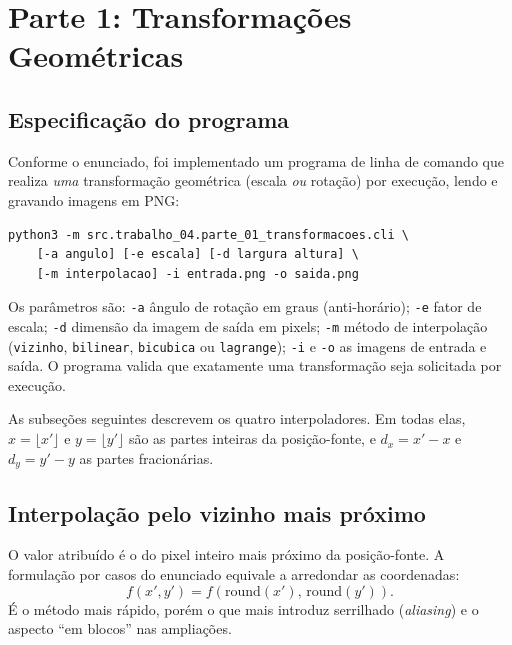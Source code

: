 \documentclass[12pt,a4paper]{article}
\begin{document}
\section{Parte 1: Transformações Geométricas}
\label{sec:parte1}

\subsection{Especificação do programa}

Conforme o enunciado, foi implementado um programa de linha de comando que
realiza \emph{uma} transformação geométrica (escala \emph{ou} rotação) por
execução, lendo e gravando imagens em PNG:

\begin{lstlisting}
python3 -m src.trabalho_04.parte_01_transformacoes.cli \
    [-a angulo] [-e escala] [-d largura altura] \
    [-m interpolacao] -i entrada.png -o saida.png
\end{lstlisting}

Os parâmetros são: \texttt{-a} ângulo de rotação em graus (anti-horário);
\texttt{-e} fator de escala; \texttt{-d} dimensão da imagem de saída em pixels;
\texttt{-m} método de interpolação (\texttt{vizinho}, \texttt{bilinear},
\texttt{bicubica} ou \texttt{lagrange}); \texttt{-i} e \texttt{-o} as imagens de
entrada e saída. O programa valida que exatamente uma transformação seja
solicitada por execução.

As subseções seguintes descrevem os quatro interpoladores. Em todas elas,
$x = \lfloor x' \rfloor$ e $y = \lfloor y' \rfloor$ são as partes inteiras da
posição-fonte, e $d_x = x' - x$ e $d_y = y' - y$ as partes fracionárias.

\subsection{Interpolação pelo vizinho mais próximo}

O valor atribuído é o do pixel inteiro mais próximo da posição-fonte. A
formulação por casos do enunciado equivale a arredondar as coordenadas:
\begin{equation}
  f(x', y') = f(\mathrm{round}(x'),\, \mathrm{round}(y')).
  \label{eq:vizinho}
\end{equation}
É o método mais rápido, porém o que mais introduz serrilhado (\emph{aliasing})
e o aspecto ``em blocos'' nas ampliações.
\end{document}
